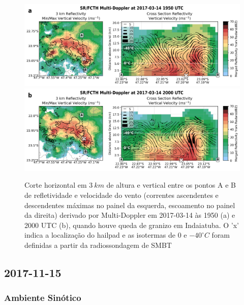 \begin{figure}[htb]
	\centering
	\caption{Corte horizontal em $3\:km$ de altura e vertical entre os pontos A e B de refletividade e velocidade do vento (correntes ascendentes e descendentes máximas no painel da esquerda, escoamento no painel da direita) derivado por Multi-Doppler em 2017-03-14 às 1950 (a) e 2000 UTC (b), quando houve queda de granizo em Indaiatuba. O 'x' indica a localização do hailpad e as isotermas de $0$ e $-40^{\circ}C$ foram definidas a partir da radiossondagem de SMBT} 
	\label{doppler_20170314_2}
	\vspace{-5pt}
	\includegraphics[width=\columnwidth]{../MultiDoppler_Processing/figures/SR-FCTH 2017-03-14 1950 UTC.png}
	\label{dopplera_20170314_2} \\
	\vspace{-15pt}
	\includegraphics[width=\columnwidth]{../MultiDoppler_Processing/figures/SR-FCTH 2017-03-14 2000 UTC.png}
	\label{dopplerb_20170314_2} \\
	\vspace{-5pt}
\end{figure}

\subsection{2017-11-15}

\subsubsection{Ambiente Sinótico}\label{sinotica_20171115}

